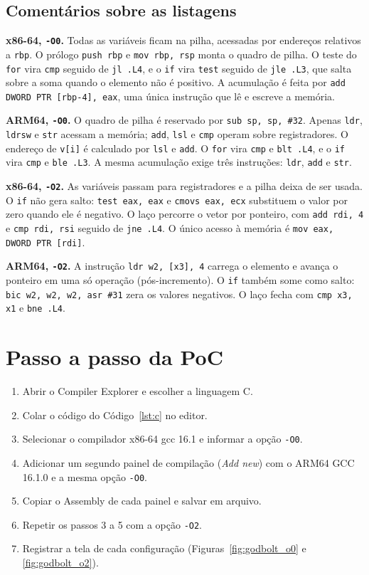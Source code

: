 \subsection{Comentários sobre as listagens}
\textbf{x86-64, \texttt{-O0}.} Todas as variáveis ficam na pilha, acessadas por endereços relativos a \texttt{rbp}. O prólogo \texttt{push rbp} e \texttt{mov rbp, rsp} monta o quadro de pilha. O teste do \texttt{for} vira \texttt{cmp} seguido de \texttt{jl .L4}, e o \texttt{if} vira \texttt{test} seguido de \texttt{jle .L3}, que salta sobre a soma quando o elemento não é positivo. A acumulação é feita por \texttt{add DWORD PTR [rbp-4], eax}, uma única instrução que lê e escreve a memória.

\textbf{ARM64, \texttt{-O0}.} O quadro de pilha é reservado por \texttt{sub sp, sp, \#32}. Apenas \texttt{ldr}, \texttt{ldrsw} e \texttt{str} acessam a memória; \texttt{add}, \texttt{lsl} e \texttt{cmp} operam sobre registradores. O endereço de \texttt{v[i]} é calculado por \texttt{lsl} e \texttt{add}. O \texttt{for} vira \texttt{cmp} e \texttt{blt .L4}, e o \texttt{if} vira \texttt{cmp} e \texttt{ble .L3}. A mesma acumulação exige três instruções: \texttt{ldr}, \texttt{add} e \texttt{str}.

\textbf{x86-64, \texttt{-O2}.} As variáveis passam para registradores e a pilha deixa de ser usada. O \texttt{if} não gera salto: \texttt{test eax, eax} e \texttt{cmovs eax, ecx} substituem o valor por zero quando ele é negativo. O laço percorre o vetor por ponteiro, com \texttt{add rdi, 4} e \texttt{cmp rdi, rsi} seguido de \texttt{jne .L4}. O único acesso à memória é \texttt{mov eax, DWORD PTR [rdi]}.

\textbf{ARM64, \texttt{-O2}.} A instrução \texttt{ldr w2, [x3], 4} carrega o elemento e avança o ponteiro em uma só operação (pós-incremento). O \texttt{if} também some como salto: \texttt{bic w2, w2, w2, asr \#31} zera os valores negativos. O laço fecha com \texttt{cmp x3, x1} e \texttt{bne .L4}.

\section{Passo a passo da PoC}
\begin{enumerate}
  \item Abrir o Compiler Explorer e escolher a linguagem C.
  \item Colar o código do Código~\ref{lst:c} no editor.
  \item Selecionar o compilador x86-64 gcc 16.1 e informar a opção \texttt{-O0}.
  \item Adicionar um segundo painel de compilação (\textit{Add new}) com o ARM64 GCC 16.1.0 e a mesma opção \texttt{-O0}.
  \item Copiar o Assembly de cada painel e salvar em arquivo.
  \item Repetir os passos 3 a 5 com a opção \texttt{-O2}.
  \item Registrar a tela de cada configuração (Figuras~\ref{fig:godbolt_o0} e \ref{fig:godbolt_o2}).
\end{enumerate}

